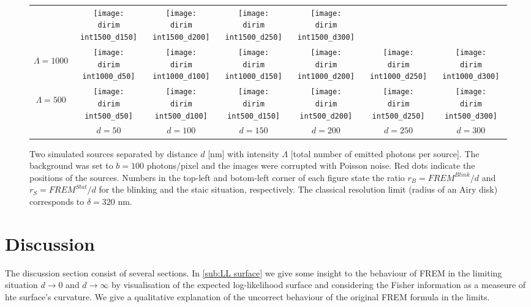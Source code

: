 \begin{figure}[!bt]
\begin{tabular}{c|cccccc}
		&\texttt{[image: \\dirim int1500\_d150]}
		&\texttt{[image: \\dirim int1500\_d200]}
		&\texttt{[image: \\dirim int1500\_d250]}
		&\texttt{[image: \\dirim int1500\_d300]}\\		
		\begin{sideways}\hspace{\vs cm}$\Lambda=1000$\end{sideways}
		&\texttt{[image: \\dirim int1000\_d50]}
		&\texttt{[image: \\dirim int1000\_d100]}
		&\texttt{[image: \\dirim int1000\_d150]}
		&\texttt{[image: \\dirim int1000\_d200]}
		&\texttt{[image: \\dirim int1000\_d250]}
		&\texttt{[image: \\dirim int1000\_d300]}\\
		\begin{sideways}\hspace{\vs cm}$\Lambda=500$\end{sideways}
		&\texttt{[image: \\dirim int500\_d50]}
		&\texttt{[image: \\dirim int500\_d100]}
		&\texttt{[image: \\dirim int500\_d150]}
		&\texttt{[image: \\dirim int500\_d200]}
		&\texttt{[image: \\dirim int500\_d250]}
		&\texttt{[image: \\dirim int500\_d300]}\\				
		\hline	
		&$d=50$ & $d=100$ & $d=150$ & $d=200$ & $d=250$ & $d=300$\\
	\end{tabular}
	\caption{Two simulated sources separated by distance $d$ [nm] with intensity $\Lambda$ [total number of emitted photons per source]. The background was set to $b=100$ photons/pixel and the images were corrupted with Poisson noise. Red dots indicate the positions of the sources. Numbers in the top-left and botom-left corner of each figure state the ratio $r_B=\unit{FREM}^{Blink}/d$ and $r_S=\unit{FREM}^{Stat}/d$ for the blinking and the staic situation, respectively. The classical resolution limit (radius of an Airy disk) corresponds to $\delta=320$ nm.}
	\label{fig:two sources int d}
\end{figure}

\clearpage
\section{Discussion\label{sec:FREM discussion}}
The discussion section consist of several sections. In \autoref{sub:LL surface} we give some insight to the behaviour of FREM in the limiting situation $d\rightarrow0$ and $d\rightarrow\infty$ by visualisation of the expected log-likelihood surface and considering the Fisher information as a measeure of hte surface's curvature. We give a qualitative explanation of the uncorrect behaviour of the original FREM formula in the limits.  

